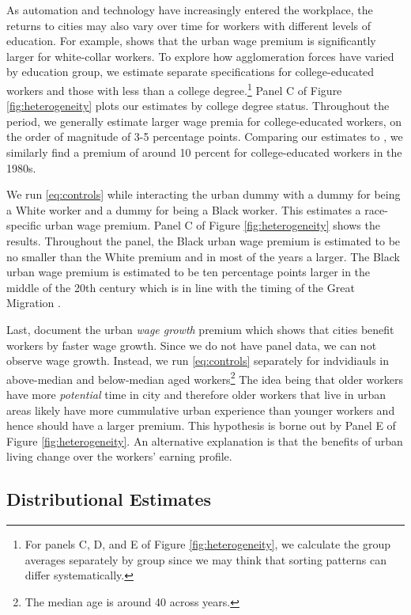 \documentclass[12pt]{article}
\newcommand{\kyle}[1]{\iftoggle{INCLUDECOMMENTS}{{\color{magenta}\textbf{Kyle:} #1}}{}}
\begin{document}
As automation and technology have increasingly entered the workplace, the returns to cities may also vary over time for workers with different levels of education.
For example, \citet{gould2007cities} shows that the urban wage premium is significantly larger for white-collar workers.
To explore how agglomeration forces have varied by education group, we estimate separate specifications for college-educated workers and those with less than a college degree.\footnote{
For panels C, D, and E of Figure \ref{fig:heterogeneity}, we calculate the group averages separately by group since we may think that sorting patterns can differ systematically.} 
Panel C of Figure \ref{fig:heterogeneity} plots our estimates by college degree status.
Throughout the period, we generally estimate larger wage premia for college-educated workers, on the order of magnitude of 3-5 percentage points.
Comparing our estimates to \citet{gould2007cities}, we similarly find a premium of around 10 percent for college-educated workers in the 1980s. 

\kyle{I think we need to discuss group-specific averages}
We run \ref{eq:controls} while interacting the urban dummy with a dummy for being a White worker and a dummy for being a Black worker. 
This estimates a race-specific urban wage premium. 
Panel C of Figure \ref{fig:heterogeneity} shows the results. 
Throughout the panel, the Black urban wage premium is estimated to be no smaller than the White premium and in most of the years a larger. 
The Black urban wage premium is estimated to be ten percentage points larger in the middle of the 20th century which is in line with the timing of the Great Migration \citep{derenoncourt2022can}.

Last, \citet{BaumSnow_Pavan_2012} document the urban \emph{wage growth} premium which shows that cities benefit workers by faster wage growth. 
Since we do not have panel data, we can not observe wage growth. 
Instead, we run \ref{eq:controls} separately for indvidiauls in above-median and below-median aged workers\footnote{
  The median age is around 40 across years.
} 
The idea being that older workers have more \emph{potential} time in city and therefore older workers that live in urban areas likely have more cummulative urban experience than younger workers and hence should have a larger premium. 
This hypothesis is borne out by Panel E of Figure \ref{fig:heterogeneity}. An alternative explanation is that the benefits of urban living change over the workers' earning profile. 


\subsection{Distributional Estimates}
\end{document}
